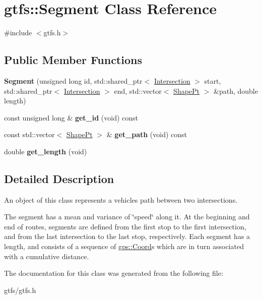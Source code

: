 \hypertarget{classgtfs_1_1Segment}{}\section{gtfs\+:\+:Segment Class Reference}
\label{classgtfs_1_1Segment}


{\ttfamily \#include $<$gtfs.\+h$>$}

\subsection*{Public Member Functions}
\begin{DoxyCompactItemize}
\item 
\mbox{\label{classgtfs_1_1Segment_ac1457d5864e30d591eede10e92f6fd85}} 
{\bfseries Segment} (unsigned long id, std\+::shared\+\_\+ptr$<$ \hyperlink{classgtfs_1_1Intersection}{Intersection} $>$ start, std\+::shared\+\_\+ptr$<$ \hyperlink{classgtfs_1_1Intersection}{Intersection} $>$ end, std\+::vector$<$ \hyperlink{structgtfs_1_1ShapePt}{Shape\+Pt} $>$ \&path, double length)
\item 
\mbox{\label{classgtfs_1_1Segment_a5c324888b7535df4623d8f32d907fca3}} 
const unsigned long \& {\bfseries get\+\_\+id} (void) const
\item 
\mbox{\label{classgtfs_1_1Segment_a9ba2506020d090ccfcd0623b58101a3b}} 
const std\+::vector$<$ \hyperlink{structgtfs_1_1ShapePt}{Shape\+Pt} $>$ \& {\bfseries get\+\_\+path} (void) const
\item 
\mbox{\label{classgtfs_1_1Segment_a4f42ea597e18e54c9ec506697eb333a9}} 
double {\bfseries get\+\_\+length} (void)
\end{DoxyCompactItemize}


\subsection{Detailed Description}
An object of this class represents a vehicles path between two intersections.

The segment has a mean and variance of \char`\"{}speed\char`\"{} along it. At the beginning and end of routes, segments are defined from the first stop to the first intersection, and from the last intersection to the last stop, respectively. Each segment has a length, and consists of a sequence of \hyperlink{classgps_1_1Coord}{gps\+::\+Coord}\textquotesingle{}s which are in turn associated with a cumulative distance. 

The documentation for this class was generated from the following file\+:\begin{DoxyCompactItemize}
\item 
gtfs/gtfs.\+h\end{DoxyCompactItemize}
